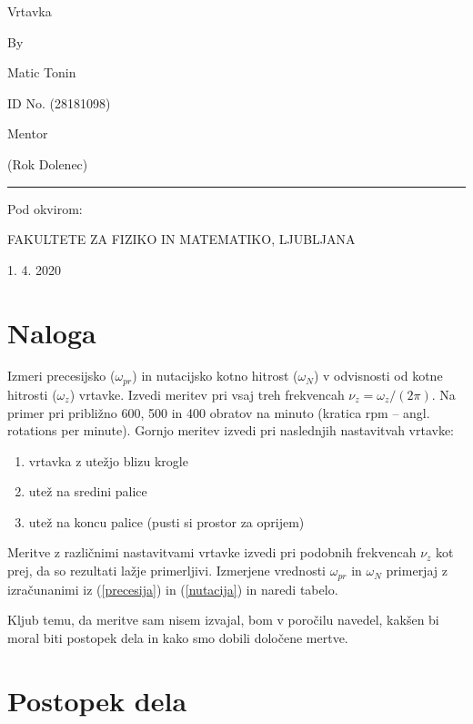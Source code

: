\documentclass[11pt, a4paper]{article}
\theoremstyle{definition}
\theoremstyle{example}
\theoremstyle{izrek}
\begin{document}
\begin{center}
\thispagestyle{empty}
\parskip=14pt%
\vspace*{3\parskip}%
\begin{Huge} Vrtavka \end{Huge}

By

Matic Tonin

ID No. (28181098)

Mentor 

(Rok Dolenec)

\rule{7cm}{0.4pt}

Pod okvirom:

FAKULTETE ZA FIZIKO IN MATEMATIKO, LJUBLJANA

1. 4. 2020

\end{center}
\pagebreak
\section{Naloga}
Izmeri precesijsko ($\omega_{pr}$) in nutacijsko kotno hitrost ($\omega_N$) v odvisnosti od kotne hitrosti ($\omega_z$) vrtavke. Izvedi meritev pri vsaj treh frekvencah $\nu_z = \omega_z/(2\pi)$. Na primer pri približno
600, 500 in 400 obratov na minuto (kratica rpm – angl. rotations per minute).
Gornjo meritev izvedi pri naslednjih nastavitvah vrtavke:

\begin{enumerate}
	\item vrtavka z utežjo blizu krogle
	\item utež na sredini palice
	\item utež na koncu palice (pusti si prostor za oprijem)
\end{enumerate}

Meritve z različnimi nastavitvami vrtavke izvedi pri podobnih frekvencah $\nu_z$ kot prej,
da so rezultati lažje primerljivi. Izmerjene vrednosti $\omega_{pr}$ in $\omega_N$ primerjaj z izračunanimi
iz (\ref{precesija}) in (\ref{nutacija}) in naredi tabelo.


Kljub temu, da meritve sam nisem izvajal, bom v poročilu navedel, kakšen bi moral biti postopek dela in kako smo dobili določene mertve. \\
\bigskip

\section{Postopek dela} 
\end{document}
